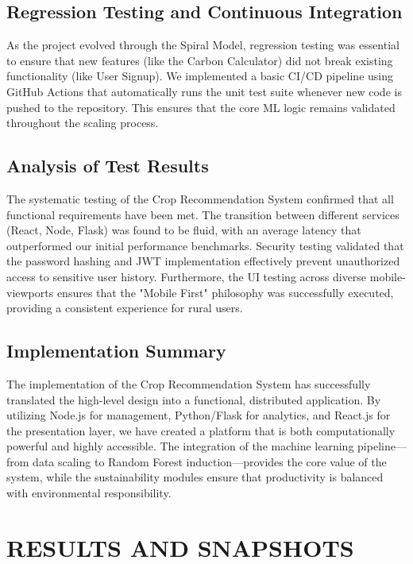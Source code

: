 \documentclass[12pt,a4paper]{report}
\begin{document}
\section{Regression Testing and Continuous Integration}
As the project evolved through the Spiral Model, regression testing was essential to ensure that new features (like the Carbon Calculator) did not break existing functionality (like User Signup). We implemented a basic CI/CD pipeline using GitHub Actions that automatically runs the unit test suite whenever new code is pushed to the repository. This ensures that the core ML logic remains validated throughout the scaling process.

\section{Analysis of Test Results}
The systematic testing of the Crop Recommendation System confirmed that all functional requirements have been met. The transition between different services (React, Node, Flask) was found to be fluid, with an average latency that outperformed our initial performance benchmarks. Security testing validated that the password hashing and JWT implementation effectively prevent unauthorized access to sensitive user history. Furthermore, the UI testing across diverse mobile-viewports ensures that the "Mobile First" philosophy was successfully executed, providing a consistent experience for rural users.

\section{Implementation Summary}
The implementation of the Crop Recommendation System has successfully translated the high-level design into a functional, distributed application. By utilizing Node.js for management, Python/Flask for analytics, and React.js for the presentation layer, we have created a platform that is both computationally powerful and highly accessible. The integration of the machine learning pipeline—from data scaling to Random Forest induction—provides the core value of the system, while the sustainability modules ensure that productivity is balanced with environmental responsibility.

\newpage
\chapter{RESULTS AND SNAPSHOTS}
\label{ch:7}
\end{document}

